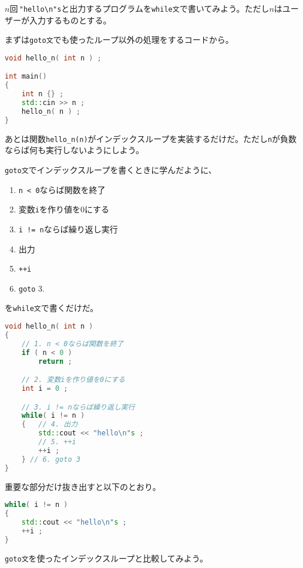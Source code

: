 
\(n\)回\,\texttt{"hello{\textbackslash}n"s}と出力するプログラムを\texttt{while文}で書いてみよう。ただし\(n\)はユーザーが入力するものとする。

まずは\texttt{goto文}でも使ったループ以外の処理をするコードから。

\begin{lstlisting}[language={C++}]
void hello_n( int n ) ;

int main()
{
    int n {} ;
    std::cin >> n ;
    hello_n( n ) ;
}
\end{lstlisting}

あとは関数\texttt{hello\_n(n)}がインデックスループを実装するだけだ。ただし\texttt{n}が負数ならば何も実行しないようにしよう。

\texttt{goto文}でインデックスループを書くときに学んだように、
\begin{enumerate}
\def\labelenumi{\arabic{enumi}.}
\item
  \texttt{n < 0}ならば関数を終了
\item
  変数\texttt{i}を作り値を0にする
\item
  \texttt{i != n}ならば繰り返し実行
\item
  出力
\item
  \texttt{++i}
\item
  \texttt{goto} 3.
\end{enumerate}
を\texttt{while文}で書くだけだ。

\ifTombow\pagebreak\fi
\begin{lstlisting}[language={C++}]
void hello_n( int n )
{
    // 1. n < 0ならば関数を終了
    if ( n < 0 )
        return ;

    // 2. 変数iを作り値を0にする
    int i = 0 ;

    // 3. i != nならば繰り返し実行
    while( i != n )
    {   // 4. 出力
        std::cout << "hello\n"s ;
        // 5. ++i
        ++i ;
    } // 6. goto 3
}
\end{lstlisting}

重要な部分だけ抜き出すと以下のとおり。

\begin{lstlisting}[language={C++}]
while( i != n )
{
    std::cout << "hello\n"s ;
    ++i ;
}
\end{lstlisting}

\texttt{goto文}を使ったインデックスループと比較してみよう。

